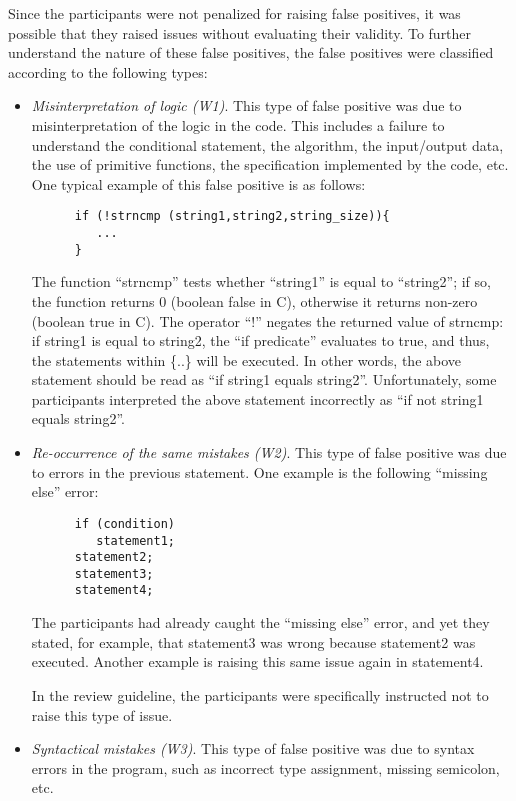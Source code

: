 Since the participants were not penalized for raising false positives,
it was possible that they raised issues without evaluating
their validity.
To further understand the nature of these false positives, the false
positives were classified according to the following types:
\begin{itemize}
\item {\it Misinterpretation of logic (W1)}. This type of false
positive  was due to misinterpretation of the logic in the code.
This includes a failure to understand the conditional
statement, the algorithm, the input/output data, the use of primitive
functions, the specification implemented by the code, etc.
One typical example of this false positive is as follows:
\small
\begin{verbatim}
      if (!strncmp (string1,string2,string_size)){ 
         ... 
      }
\end{verbatim}
\normalsize
The function ``strncmp'' tests whether ``string1'' is equal to
``string2''; if so, the function returns 0 (boolean false in C), otherwise
it returns non-zero (boolean true in C). The operator 
``!'' negates the returned value of strncmp: if string1 is
equal to string2, the ``if predicate'' evaluates to true, and thus,
the statements within \{..\} will be executed. In other words, the
above statement should be read as ``if string1 equals string2''.
Unfortunately, some participants interpreted the above statement
incorrectly as ``if not string1 equals string2''.

\item {\it Re-occurrence of the same mistakes (W2)}. This type of false
positive was due to errors in the previous statement.
One example is the following ``missing else'' error:
\small
\begin{verbatim}
      if (condition)
         statement1;
      statement2;
      statement3;
      statement4; 
\end{verbatim}
\normalsize
The participants had already caught the ``missing else'' error, and
yet they stated, for example,  
that statement3 was wrong because statement2 was executed. 
Another example is raising this same issue again in statement4. 

In the review guideline, the participants were specifically instructed
not to raise this type of issue.

\item {\it Syntactical mistakes (W3)}. This type of false positive
was due to syntax errors in the program, such as
incorrect type assignment, missing semicolon, etc.


\end{itemize}
